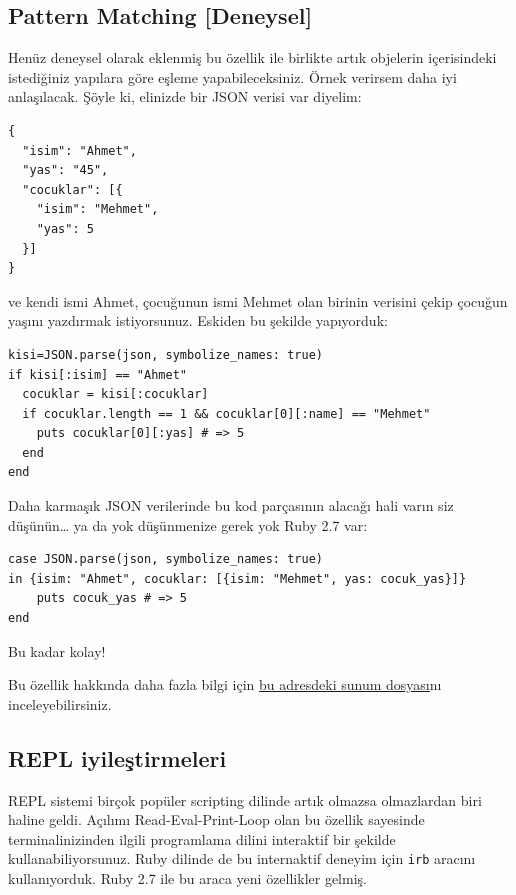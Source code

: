 \documentclass[11pt]{article}
\begin{document}
\subsection{Pattern Matching [Deneysel]}
\label{sec:orga2fa8cd}
Henüz deneysel olarak eklenmiş bu özellik ile birlikte artık objelerin
içerisindeki istediğiniz yapılara göre eşleme yapabileceksiniz. Örnek verirsem
daha iyi anlaşılacak. Şöyle ki, elinizde bir JSON verisi var diyelim:
\newpage
\begin{verbatim}
{
  "isim": "Ahmet",
  "yas": "45",
  "cocuklar": [{
    "isim": "Mehmet",
    "yas": 5
  }]
}
\end{verbatim}
ve kendi ismi Ahmet, çocuğunun ismi Mehmet olan birinin verisini çekip çocuğun
yaşını yazdırmak istiyorsunuz. Eskiden bu şekilde yapıyorduk:
\begin{verbatim}
kisi=JSON.parse(json, symbolize_names: true)
if kisi[:isim] == "Ahmet"
  cocuklar = kisi[:cocuklar]
  if cocuklar.length == 1 && cocuklar[0][:name] == "Mehmet"
    puts cocuklar[0][:yas] # => 5
  end
end
\end{verbatim}
Daha karmaşık JSON verilerinde bu kod parçasının alacağı hali varın siz
düşünün\ldots{} ya da yok düşünmenize gerek yok Ruby 2.7 var:
\begin{verbatim}
case JSON.parse(json, symbolize_names: true)
in {isim: "Ahmet", cocuklar: [{isim: "Mehmet", yas: cocuk_yas}]}
    puts cocuk_yas # => 5
end
\end{verbatim}
Bu kadar kolay!

Bu özellik hakkında daha fazla bilgi için \href{https://speakerdeck.com/k\_tsj/pattern-matching-new-feature-in-ruby-2-dot-7}{bu adresdeki sunum dosyası}nı
inceleyebilirsiniz.
\subsection{REPL iyileştirmeleri}
\label{sec:org3183d9e}
REPL sistemi birçok popüler scripting dilinde artık olmazsa olmazlardan biri
haline geldi. Açılımı Read-Eval-Print-Loop olan bu özellik sayesinde
terminalinizinden ilgili programlama dilini interaktif bir şekilde
kullanabiliyorsunuz. Ruby dilinde de bu internaktif deneyim için \texttt{irb} aracını
kullanıyorduk. Ruby 2.7 ile bu araca yeni özellikler gelmiş.
\end{document}
